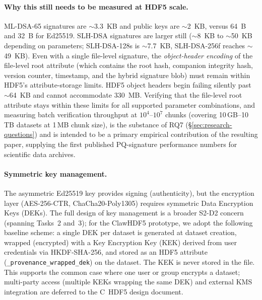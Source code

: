 \documentclass[11pt]{article}
\begin{document}
\paragraph{Why this still needs to be measured at HDF5 scale.}
ML-DSA-65 signatures are $\sim$3.3~KB and public keys are $\sim$2~KB, versus
64~B and 32~B for Ed25519. SLH-DSA signatures are larger still ($\sim$8~KB
to $\sim$50~KB depending on parameters; SLH-DSA-128s is $\sim$7.7~KB,
SLH-DSA-256f reaches $\sim$49~KB). Even with a single file-level
signature, the \emph{object-header encoding} of the file-level root attribute
(which contains the root hash, companion integrity hash, version counter,
timestamp, and the hybrid signature blob) must remain within HDF5's
attribute-storage limits. HDF5 object headers begin failing silently past
$\sim$64~KB and cannot accommodate 330~MB. Verifying that the
file-level root attribute stays within these limits for all supported
parameter combinations, and measuring batch verification throughput at
$10^4$--$10^7$ chunks (covering 10\,GB--10\,TB datasets at 1\,MB chunk size), is the substance of RQ7
(\S\ref{sec:research-questions}) and is intended to be a primary empirical
contribution of the resulting paper, supplying the first published
PQ-signature performance numbers for scientific data archives.

\paragraph{Symmetric key management.}
The asymmetric Ed25519 key provides signing (authenticity), but the encryption
layer (AES-256-CTR, ChaCha20-Poly1305) requires symmetric Data Encryption Keys
(DEKs). The full design of key management is a broader S2-D2 concern (spanning
Tasks~2 and~3); for the ClawHDF5 prototype, we adopt the following baseline
scheme: a single DEK per dataset is generated at dataset creation, wrapped
(encrypted) with a Key Encryption Key (KEK) derived from user credentials via
HKDF-SHA-256, and stored as an HDF5 attribute
(\texttt{\_provenance\_wrapped\_dek}) on the dataset. The KEK is never stored
in the file. This supports the common case where one user or group encrypts a
dataset; multi-party access (multiple KEKs wrapping the same DEK) and external
KMS integration are deferred to the C~HDF5 design document.
\end{document}
